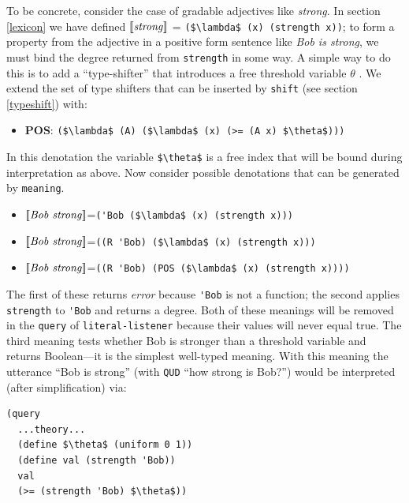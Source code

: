 \documentclass[pdfextras]{handbook}
\newcommand{\llbracket}{\ensuremath{\left [\!\left [}}%
\newcommand{\rrbracket}{\ensuremath{\right ]\!\right ]}}
\providecommand{\sv}[1]{\ensuremath{\llbracket \mathit{#1} \rrbracket}}
\begin{document}
To be concrete, consider the case of gradable adjectives like \emph{strong}. In section \ref{lexicon} we have defined \sv{\mathit{strong}} = \lstinline[mathescape]{($\lambda$ (x) (strength x))}; to form a property from the adjective in a positive form sentence like \emph{Bob is strong}, we must bind the degree returned from \lstinline{strength} in some way.
A simple way to do this is to add a ``type-shifter'' that introduces a free threshold variable $\theta$ \citep[See for example][]{neeleman2004degree}. We extend the set of type shifters that can be inserted by \lstinline{shift} (see section \ref{typeshift}) with:
\begin{itemize}
\item \textbf{POS}:  \lstinline[mathescape]{($\lambda$ (A) ($\lambda$ (x) (>= (A x) $\theta$)))}
\end{itemize}
In this denotation the variable \lstinline[mathescape]{$\theta$} is a free index that will be bound during interpretation as above.
Now consider possible denotations that can be generated by \lstinline{meaning}.
\begin{itemize}
\item \sv{Bob\ strong}=\lstinline[mathescape]{('Bob ($\lambda$ (x) (strength x)))}
\item \sv{Bob\ strong}=\lstinline[mathescape]{((R 'Bob) ($\lambda$ (x) (strength x)))}
\item \sv{Bob\ strong}=\lstinline[mathescape]{((R 'Bob) (POS ($\lambda$ (x) (strength x))))}
\end{itemize}
The first of these returns \emph{error} because \lstinline{'Bob} is not a function; the second applies \lstinline{strength} to \lstinline{'Bob} and returns a degree. Both of these meanings will be removed in the \lstinline{query} of \lstinline{literal-listener} because their values will never equal true. The third meaning tests whether Bob is stronger than a threshold variable and returns Boolean---it is the simplest well-typed meaning.
With this meaning the utterance ``Bob is strong'' (with \lstinline{QUD} ``how strong is Bob?'') would be interpreted (after simplification) via:
\begin{lstlisting}[mathescape]
(query
  ...theory...
  (define $\theta$ (uniform 0 1))
  (define val (strength 'Bob))
  val
  (>= (strength 'Bob) $\theta$))
\end{lstlisting}
\end{document}
